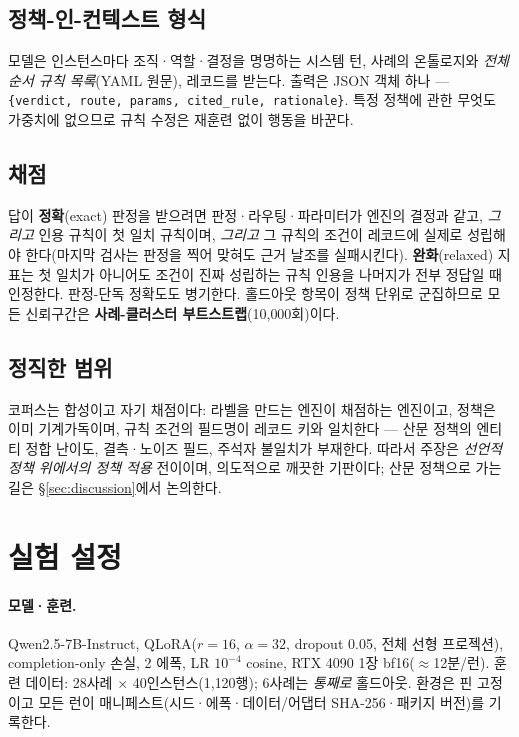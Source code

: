 \documentclass[11pt]{article}
\begin{document}
\subsection{정책-인-컨텍스트 형식}
모델은 인스턴스마다 조직·역할·결정을 명명하는 시스템 턴, 사례의 온톨로지와 \emph{전체 순서 규칙 목록}(YAML 원문), 레코드를 받는다. 출력은 JSON 객체 하나 --- \texttt{\{verdict, route, params, cited\_rule, rationale\}}. 특정 정책에 관한 무엇도 가중치에 없으므로 규칙 수정은 재훈련 없이 행동을 바꾼다.

\subsection{채점}\label{sec:grading}
답이 \textbf{정확}(exact) 판정을 받으려면 판정·라우팅·파라미터가 엔진의 결정과 같고, \emph{그리고} 인용 규칙이 첫 일치 규칙이며, \emph{그리고} 그 규칙의 조건이 레코드에 실제로 성립해야 한다(마지막 검사는 판정을 찍어 맞혀도 근거 날조를 실패시킨다). \textbf{완화}(relaxed) 지표는 첫 일치가 아니어도 조건이 진짜 성립하는 규칙 인용을 나머지가 전부 정답일 때 인정한다. 판정-단독 정확도도 병기한다. 홀드아웃 항목이 정책 단위로 군집하므로 모든 신뢰구간은 \textbf{사례-클러스터 부트스트랩}(10{,}000회)이다.

\subsection{정직한 범위}\label{sec:scope}
코퍼스는 합성이고 자기 채점이다: 라벨을 만드는 엔진이 채점하는 엔진이고, 정책은 이미 기계가독이며, 규칙 조건의 필드명이 레코드 키와 일치한다 --- 산문 정책의 엔티티 정합 난이도, 결측·노이즈 필드, 주석자 불일치가 부재한다. 따라서 주장은 \emph{선언적 정책 위에서의 정책 적용} 전이이며, 의도적으로 깨끗한 기판이다; 산문 정책으로 가는 길은 \S\ref{sec:discussion}에서 논의한다.

\section{실험 설정}

\paragraph{모델·훈련.} Qwen2.5-7B-Instruct, QLoRA($r{=}16$, $\alpha{=}32$, dropout 0.05, 전체 선형 프로젝션), completion-only 손실, 2 에폭, LR $10^{-4}$ cosine, RTX 4090 1장 bf16($\approx$12분/런). 훈련 데이터: 28사례 $\times$ 40인스턴스(1{,}120행); 6사례는 \emph{통째로} 홀드아웃. 환경은 핀 고정이고 모든 런이 매니페스트(시드·에폭·데이터/어댑터 SHA-256·패키지 버전)를 기록한다.
\end{document}
